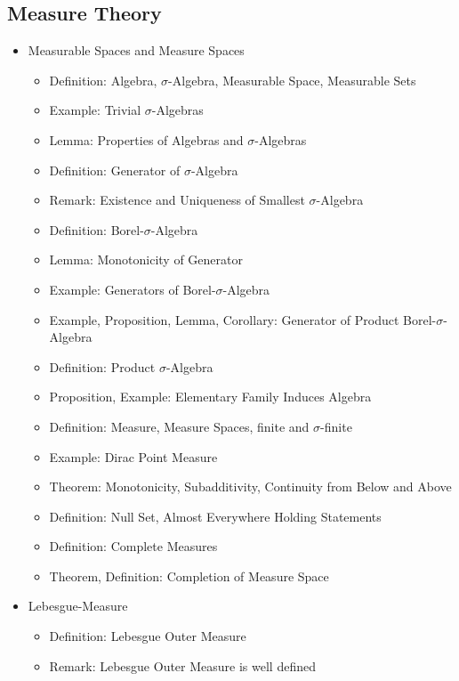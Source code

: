 \documentclass[8pt,twocolumn]{article}
\begin{document}
    \subsection{Measure Theory} %
    \label{sub:measure_theory}
      \begin{itemize}
        \item Measurable Spaces and Measure Spaces
          \begin{itemize}
            \item Definition: Algebra, $\sigma$-Algebra, Measurable Space, Measurable Sets
            \item Example: Trivial $\sigma$-Algebras
            \item Lemma: Properties of Algebras and $\sigma$-Algebras
            \item Definition: Generator of $\sigma$-Algebra
            \item Remark: Existence and Uniqueness of Smallest $\sigma$-Algebra
            \item Definition: Borel-$\sigma$-Algebra
            \item Lemma: Monotonicity of Generator
            \item Example: Generators of Borel-$\sigma$-Algebra
            \item Example, Proposition, Lemma, Corollary: Generator of Product Borel-$\sigma$-Algebra
            \item Definition: Product $\sigma$-Algebra
            \item Proposition, Example: Elementary Family Induces Algebra
            \item Definition: Measure, Measure Spaces, finite and $\sigma$-finite
            \item Example: Dirac Point Measure
            \item Theorem: Monotonicity, Subadditivity, Continuity from Below and Above
            \item Definition: Null Set, Almost Everywhere Holding Statements
            \item Definition: Complete Measures
            \item Theorem, Definition: Completion of Measure Space
          \end{itemize}
        \item Lebesgue-Measure
          \begin{itemize}
            \item Definition: Lebesgue Outer Measure
            \item Remark: Lebesgue Outer Measure is well defined

\end{itemize}
\end{itemize}
\end{document}
